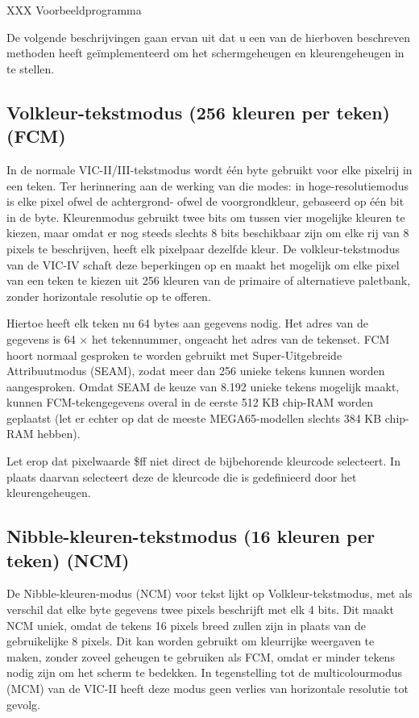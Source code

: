 XXX Voorbeeldprogramma

De volgende beschrijvingen gaan ervan uit dat u een van de hierboven beschreven methoden heeft geïmplementeerd om het schermgeheugen en kleurengeheugen in te stellen.

\subsection{Volkleur-tekstmodus (256 kleuren per teken) (FCM)}

In de normale VIC-II/III-tekstmodus wordt één byte gebruikt voor elke pixelrij in een teken. Ter herinnering aan de werking van die modes: in hoge-resolutiemodus is elke pixel ofwel de achtergrond- ofwel de voorgrondkleur, gebaseerd op één bit in de byte. Kleurenmodus gebruikt twee bits om tussen vier mogelijke kleuren te kiezen, maar omdat er nog steeds slechts 8 bits beschikbaar zijn om elke rij van 8 pixels te beschrijven, heeft elk pixelpaar dezelfde kleur. De volkleur-tekstmodus van de VIC-IV schaft deze beperkingen op en maakt het mogelijk om elke pixel van een teken te kiezen uit 256 kleuren van de primaire of alternatieve paletbank, zonder horizontale resolutie op te offeren.

Hiertoe heeft elk teken nu 64 bytes aan gegevens nodig. Het adres van de gegevens is 64 $\times$ het tekennummer, ongeacht het adres van de tekenset. FCM hoort normaal gesproken te worden gebruikt met Super-Uitgebreide Attribuutmodus (SEAM), zodat meer dan 256 unieke tekens kunnen worden aangesproken. Omdat SEAM de keuze van 8.192 unieke tekens mogelijk maakt, kunnen FCM-tekengegevens overal in de eerste 512 KB chip-RAM worden geplaatst (let er echter op dat de meeste MEGA65-modellen slechts 384 KB chip-RAM hebben).

Let erop dat pixelwaarde \$ff niet direct de bijbehorende kleurcode selecteert. In plaats daarvan selecteert deze de kleurcode die is gedefinieerd door het kleurengeheugen.

\subsection{Nibble-kleuren-tekstmodus (16 kleuren per teken) (NCM)}

De Nibble-kleuren-modus (NCM) voor tekst lijkt op Volkleur-tekstmodus, met als verschil dat elke byte gegevens twee pixels beschrijft met elk 4 bits. Dit maakt NCM uniek, omdat de tekens 16 pixels breed zullen zijn in plaats van de gebruikelijke 8 pixels. Dit kan worden gebruikt om kleurrijke weergaven te maken, zonder zoveel geheugen te gebruiken als FCM, omdat er minder tekens nodig zijn om het scherm te bedekken. In tegenstelling tot de multicolourmodus (MCM) van de VIC-II heeft deze modus geen verlies van horizontale resolutie tot gevolg.

